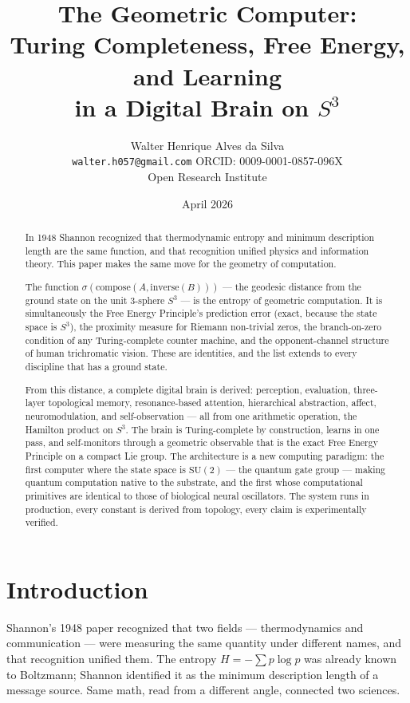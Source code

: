 \documentclass[12pt,a4paper]{article}
\title{The Geometric Computer:\\
Turing Completeness, Free Energy, and Learning\\
in a Digital Brain on $S^3$}
\author{
Walter Henrique Alves da Silva\\
\texttt{walter.h057@gmail.com}\quad
ORCID: 0009-0001-0857-096X\\[4pt]
Open Research Institute
}
\date{April 2026}
\theoremstyle{definition}
\theoremstyle{remark}
\begin{document}
\maketitle

\begin{abstract}
In 1948 Shannon recognized that thermodynamic entropy and minimum description
length are the same function, and that recognition unified physics and
information theory. This paper makes the same move for the geometry of
computation.

The function $\sigma(\mathrm{compose}(A, \mathrm{inverse}(B)))$ --- the
geodesic distance from the ground state on the unit 3-sphere $S^3$ --- is
the entropy of geometric computation. It is simultaneously the Free Energy
Principle's prediction error (exact, because the state space is $S^3$), the
proximity measure for Riemann non-trivial zeros, the branch-on-zero condition
of any Turing-complete counter machine, and the opponent-channel structure
of human trichromatic vision. These are identities, and the list extends to
every discipline that has a ground state.

From this distance, a complete digital brain is derived: perception,
evaluation, three-layer topological memory, resonance-based attention,
hierarchical abstraction, affect, neuromodulation, and self-observation ---
all from one arithmetic operation, the Hamilton product on $S^3$. The
brain is Turing-complete by construction, learns in one pass, and
self-monitors through a geometric observable that is the exact Free Energy
Principle on a compact Lie group. The architecture is a new computing
paradigm: the first computer where the state space is $\mathrm{SU}(2)$
--- the quantum gate group --- making quantum computation native to the
substrate, and the first whose computational primitives are identical to
those of biological neural oscillators. The system runs in production, 
every constant is derived from topology, every claim is experimentally
verified.
\end{abstract}

\tableofcontents\newpage

\section{Introduction}

Shannon's 1948 paper recognized that two fields --- thermodynamics and
communication --- were measuring the same quantity under different names,
and that recognition unified them. The entropy $H = -\sum p \log p$ was
already known to Boltzmann; Shannon identified it as the minimum
description length of a message source.  Same math, read from
a different angle, connected two sciences.
\end{document}
